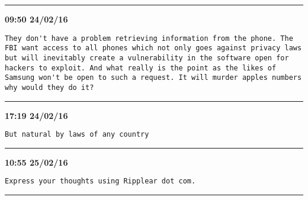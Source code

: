 \hrule%

\begin{adjustwidth}{0cm}{0cm}
\footnotesize \textbf{09:50 24/02/16}

\begin{lstlisting}[breaklines, breakatwhitespace, basicstyle=\small, frame=leftline]
They don't have a problem retrieving information from the phone. The FBI want access to all phones which not only goes against privacy laws but will inevitably create a vulnerability in the software open for hackers to exploit. And what really is the point as the likes of Samsung won't be open to such a request. It will murder apples numbers why would they do it?
\end{lstlisting}
\end{adjustwidth}

\hrule%

\begin{adjustwidth}{0cm}{0cm}
\footnotesize \textbf{17:19 24/02/16}

\begin{lstlisting}[breaklines, breakatwhitespace, basicstyle=\small, frame=leftline]
But natural by laws of any country
\end{lstlisting}
\end{adjustwidth}

\hrule%

\begin{adjustwidth}{0cm}{0cm}
\footnotesize \textbf{10:55 25/02/16}

\begin{lstlisting}[breaklines, breakatwhitespace, basicstyle=\small, frame=leftline]
Express your thoughts using Ripplear dot com.
\end{lstlisting}
\end{adjustwidth}

\hrule%

